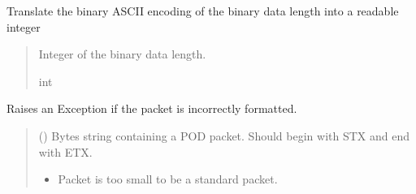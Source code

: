 \documentclass[letterpaper,10pt,english]{sphinxmanual}
\begin{document}
\begin{fulllineitems}
\begin{fulllineitems}
\begin{quote}
\begin{description}
\end{description}\end{quote}

\end{fulllineitems}


\begin{fulllineitems}
\label{\detokenize{Morelia.Packets:Morelia.Packets.Binary.PacketBinary.BinaryLength}}
\pysigstartsignatures
{}
\pysigstopsignatures
\sphinxAtStartPar
Translate the binary ASCII encoding of the binary data length         into a readable integer
\begin{quote}\begin{description}
\sphinxAtStartPar
Integer of the binary data length.

\sphinxAtStartPar
int

\end{description}\end{quote}

\end{fulllineitems}


\begin{fulllineitems}
\label{\detokenize{Morelia.Packets:Morelia.Packets.Binary.PacketBinary.CheckIfPacketIsValid}}
\pysigstartsignatures
{}
\pysigstopsignatures
\sphinxAtStartPar
Raises an Exception if the packet is incorrectly formatted.
\begin{quote}\begin{description}
\sphinxAtStartPar
{} () \textendash{} Bytes string containing a POD packet. Should begin with STX                 and end with ETX.

\begin{itemize}
\item {} 
\sphinxAtStartPar
{} \textendash{} Packet is too small to be a standard packet.


\end{itemize}
\end{description}
\end{quote}
\end{fulllineitems}
\end{fulllineitems}
\end{document}
